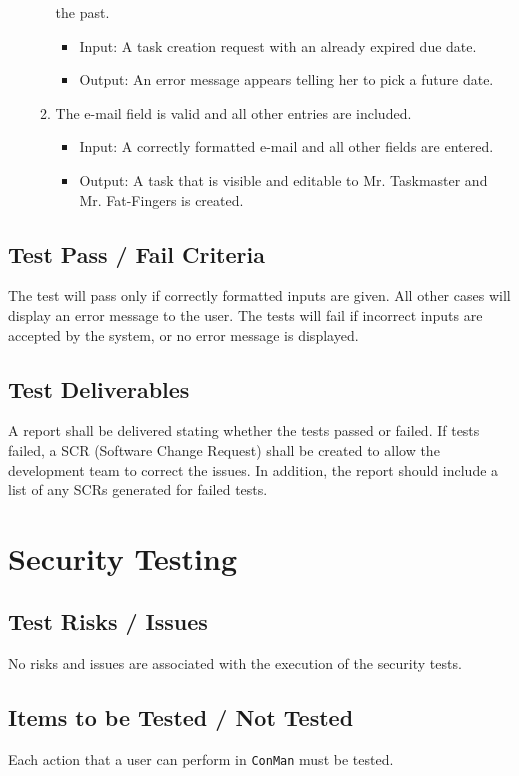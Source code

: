 \documentclass{article}
\begin{document}
\begin{enumerate}
\begin{enumerate}
the past.
            \begin{itemize}
                \item Input: A task creation request with an already expired
due date.
                \item Output: An error message appears telling her to pick a
future date.
            \end{itemize}
        \item The e-mail field is valid and all other entries are included.
            \begin{itemize}
                \item Input: A correctly formatted e-mail and all other fields
are entered.
                \item Output: A task that is visible and editable to Mr.
Taskmaster and Mr. Fat-Fingers is created.
            \end{itemize}
    \end{enumerate}
\end{enumerate}

\subsection{Test Pass / Fail Criteria}
The test will pass only if correctly formatted inputs are given.  
All other cases will display an error message to the user.  
The tests will fail if incorrect inputs are accepted by the system, or no error message is displayed.

\subsection{Test Deliverables}
A report shall be delivered stating whether the tests passed or failed. If tests failed, a SCR
(Software Change Request) shall be created to allow the development team to correct the
issues. In addition, the report should include a list of any SCRs generated for failed 
tests.

\newpage
\section{Security Testing}
\subsection{Test Risks / Issues}
No risks and issues are associated with the execution of the security tests.

\subsection{Items to be Tested / Not Tested}
Each action that a user can perform in \texttt{ConMan} must be tested.\newline
\end{document}
